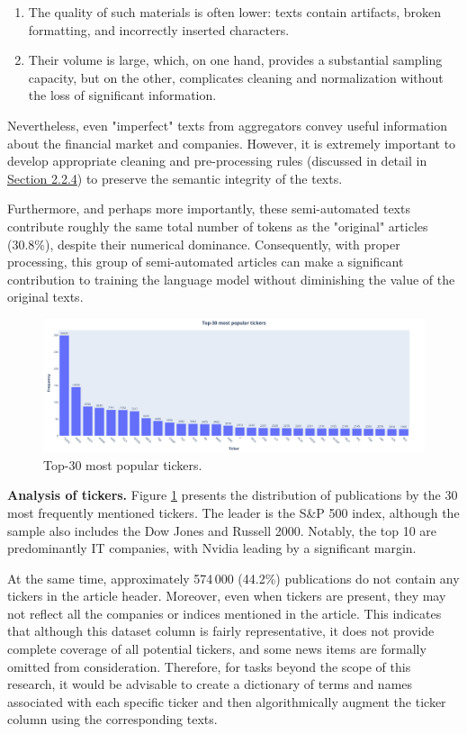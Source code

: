 \begin{enumerate}
    \item The quality of such materials is often lower: texts contain artifacts, broken formatting, and incorrectly inserted characters.
    \item Their volume is large, which, on one hand, provides a substantial sampling capacity, but on the other, complicates cleaning and normalization without the loss of significant information.
\end{enumerate}

Nevertheless, even "imperfect" texts from aggregators convey useful information about the financial market and companies. However,
it is extremely important to develop appropriate cleaning and pre-processing rules (discussed in detail in \hyperref[sec:data_prep]{Section 2.2.4})
to preserve the semantic integrity of the texts.

Furthermore, and perhaps more importantly, these semi-automated texts contribute roughly the same total number of tokens
as the "original" articles (30.8\%), despite their numerical dominance. Consequently, with proper processing, this group of semi-automated
articles can make a significant contribution to training the language model without diminishing the value of the original texts.

\begin{figure}[H]
    \centering
    \includegraphics[width=1\linewidth]{img/top30_tickers.png}
    \caption{\label{fig:dist_tickers}Top-30 most popular tickers.}
\end{figure}

\textbf{Analysis of tickers.} Figure \ref{fig:dist_tickers} presents the distribution of publications by the 30 most frequently mentioned
tickers. The leader is the S\&P 500 index, although the sample also includes the Dow Jones and Russell 2000. Notably, the top 10 are predominantly
IT companies, with Nvidia leading by a significant margin.

At the same time, approximately 574\,000 (44.2\%) publications do not contain any tickers in the article header. Moreover, even when tickers
are present, they may not reflect all the companies or indices mentioned in the article. This indicates that although this dataset column
is fairly representative, it does not provide complete coverage of all potential tickers, and some news items are formally omitted
from consideration. Therefore, for tasks beyond the scope of this research, it would be advisable to create a dictionary of terms
and names associated with each specific ticker and then algorithmically augment the ticker column using the corresponding texts.


